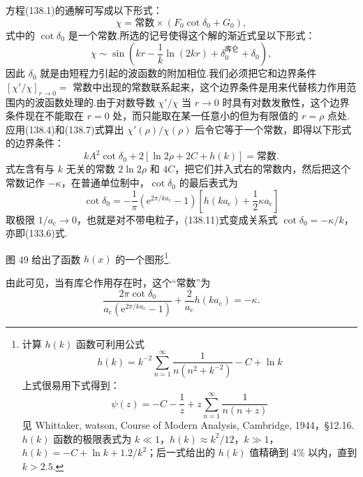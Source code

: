 方程(138.1)的通解可写成以下形式：
\begin{equation}
  \chi=\text{常数}\times(F_0\cot\delta_0+G_0),
\end{equation}
式中的 $\cot\delta_0$ 是一个常数.所选的记号使得这个解的渐近式呈以下形式：
\begin{equation}
  \chi\sim\sin\left(kr-\frac{1}{k}\ln(2kr)
  +\delta_0^{\text{库仑}}+\delta_0\right),
\end{equation}
因此 $\delta_0$ 就是由短程力引起的波函数的附加相位.我们必须把它和边界条件
$[\chi'/\chi]_{r\to0}=$ 常数中出现的常数联系起来，这个边界条件是用来代替核力作用范围内的波函数处理的.由于对数导数 $\chi'/\chi$ 当 $r\to0$ 时具有对数发散性，这个边界条件现在不能取在 $r=0$ 处，而只能取在某一任意小的但为有限值的 $r=\rho$ 点处.应用(138.4)和(138.7)式算出 $\chi'(\rho)/\chi(\rho)$ 后令它等于一个常数，即得以下形式的边界条件：
\begin{equation*}
  kA^2\cot\delta_0+2\left[\ln 2\rho+2C+h(k)\right]=\text{常数}.
\end{equation*}
式左含有与 $k$ 无关的常数 $2\ln 2\rho$ 和 $4C$，把它们并入式右的常数内，然后把这个常数记作 $-\kappa$，在普通单位制中，$\cot\delta_0$ 的最后表式为
\begin{equation}
  \cot\delta_0=-\frac{1}{\pi}
  \left(\mathrm{e}^{2\pi/ka_{\mathrm{c}}}-1\right)
  \left[h(ka_{\mathrm{c}})+\frac{1}{2}\kappa a_{\mathrm{c}}\right]
\end{equation}
取极限 $1/a_{\mathrm{c}}\to0$，也就是对不带电粒子，(138.11)式变成关系式
$\cot\delta_0=-\kappa/k$，亦即(133.6)式.

图 49 给出了函数 $h(x)$ 的一个图形\footnote{计算 $h(k)$ 函数可利用公式
\begin{equation*}
  h(k)=k^{-2}\sum_{n=1}^{\infty}\frac{1}{n\left(n^2+k^{-2}\right)}-C+\ln k
\end{equation*}
上式很易用下式得到：
\begin{equation*}
  \psi(z)=-C-\frac{1}{z}+z\sum_{n=1}^{\infty}\frac{1}{n(n+z)}
\end{equation*}
见 Whittaker, watson, Course of Modern Analysis, Cambridge, 1944，§12.16.$h(k)$ 函数的极限表式为 $k\ll1$，$h(k)\approx k^2/12$，$k\gg1$，$h(k)=-C+\ln k+1.2/k^2$；后一式给出的 $h(k)$ 值精确到 4\% 以内，直到 $k>2.5$.}.


由此可见，当有库仑作用存在时，这个“常数”为
\begin{equation}
  \frac{2\pi\cot\delta_0}
  {a_{\mathrm{c}}\left(\mathrm{e}^{2\pi/ka_{\mathrm{c}}}-1\right)}
  +\frac{2}{a_{\mathrm{c}}}h(ka_{\mathrm{c}})=-\kappa.
\end{equation}

